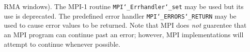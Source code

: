 RMA windows).  The MPI-1 routine {\tt MPI{\tt \char`\_}Errhandler{\tt \char`\_}set} may be used but
its use is deprecated.  The predefined error handler
{\tt MPI{\tt \char`\_}ERRORS{\tt \char`\_}RETURN} may be used to cause error values to be returned.
Note that MPI does {\em not} guarentee that an MPI program can continue past
an error; however, MPI implementations will attempt to continue whenever
possible.
\par
{}
\par
{}
\endmanpage

